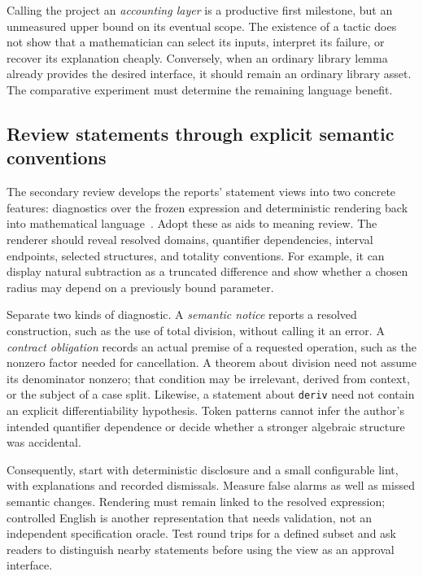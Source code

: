 \documentclass[11pt,letterpaper]{article}
\newcommand{\code}[1]{\nolinkurl{#1}}
\begin{document}
Calling the project an \emph{accounting layer} is a productive first milestone,
but an unmeasured upper bound on its eventual scope. The existence of a tactic
does not show that a mathematician can select its inputs, interpret its failure,
or recover its explanation cheaply. Conversely, when an ordinary library lemma
already provides the desired interface, it should remain an ordinary library
asset. The comparative experiment must determine the remaining language benefit.

\subsection{Review statements through explicit semantic conventions}\label{sec:lint}
The secondary review develops the reports' statement views into two concrete
features: diagnostics over the frozen expression and deterministic rendering
back into mathematical language~\cite[\S7.4]{secondary}. Adopt these as aids to
meaning review. The renderer should reveal resolved domains, quantifier
dependencies, interval endpoints, selected structures, and totality conventions.
For example, it can display natural subtraction as a truncated difference and
show whether a chosen radius may depend on a previously bound parameter.

Separate two kinds of diagnostic. A \emph{semantic notice} reports a resolved
construction, such as the use of total division, without calling it an error.
A \emph{contract obligation} records an actual premise of a requested operation,
such as the nonzero factor needed for cancellation. A theorem about division
need not assume its denominator nonzero; that condition may be irrelevant,
derived from context, or the subject of a case split. Likewise, a statement
about \code{deriv} need not contain an explicit differentiability hypothesis.
Token patterns cannot infer the author's intended quantifier dependence or
decide whether a stronger algebraic structure was accidental.

Consequently, start with deterministic disclosure and a small configurable lint,
with explanations and recorded dismissals. Measure false alarms as well as
missed semantic changes. Rendering must remain linked to the resolved expression;
controlled English is another representation that needs validation, not an
independent specification oracle. Test round trips for a defined subset and
ask readers to distinguish nearby statements before using the view as an
approval interface.
\end{document}

